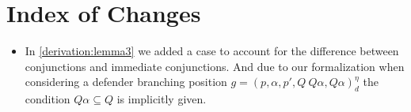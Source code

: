 \section{Index of Changes}

\begin{itemize}
   \item In \ref{derivation:lemma3} we added a case to account for the difference between 
conjunctions and immediate conjunctions. And due to our formalization when considering a
defender branching position $g=(p,\alpha ,p', Q \ Q\alpha, Q\alpha)_d^\eta$ the condition 
$Q \alpha \subseteq Q$ is implicitly given.
\end{itemize}